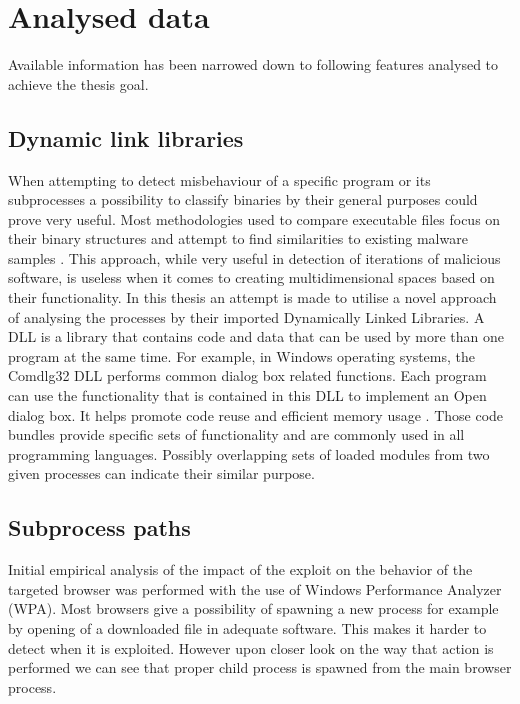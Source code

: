 \documentclass[a4paper,twoside,12pt]{book}
\begin{document}
\section{Analysed data}
Available information has been narrowed down to following features analysed to achieve the thesis
goal.

\subsection{Dynamic link libraries}

When attempting to detect misbehaviour of a specific program or its subprocesses a possibility to 
classify binaries by their general purposes could prove very useful. Most methodologies used to 
compare executable files focus on their binary structures and attempt to find similarities to 
existing malware samples \cite{bib:malwclass}. This approach, while very useful in detection of 
iterations of malicious software, is useless when it comes to creating multidimensional spaces 
based on their functionality. In this thesis an attempt is made to utilise a novel approach of 
analysing the processes by their imported Dynamically Linked Libraries. A DLL is a library that 
contains code and data that can be used by more than one program at the same time. For example, 
in Windows operating systems, the Comdlg32 DLL performs common dialog box related functions. Each 
program can use the functionality that is contained in this DLL to implement an Open dialog box. 
It helps promote code reuse and efficient memory usage \cite{bib:dll}. Those code bundles provide 
specific sets of functionality and are commonly used in all programming languages. Possibly 
overlapping sets of loaded modules from two given processes can indicate their similar purpose. 

\subsection{Subprocess paths}

Initial empirical analysis of the impact of the exploit on the behavior of the targeted browser was 
performed with the use of Windows Performance Analyzer (WPA).  Most browsers give a 
possibility of spawning a new process for example by opening of a downloaded file in 
adequate software. This makes it harder to detect when it is exploited. However upon 
closer look on the way that action is performed we can see that proper child process is 
spawned from the main browser process.
\end{document}
